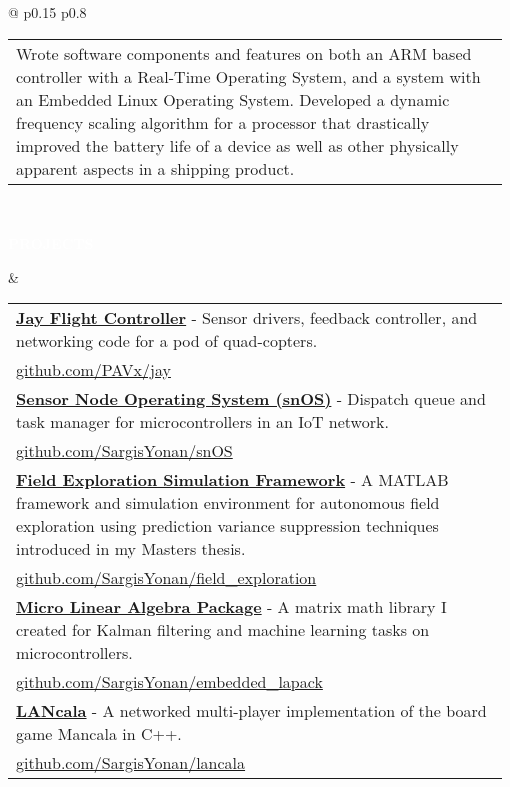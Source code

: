 \documentclass[letterpaper,11pt,oneside,a4paper]{article}
\makeatletter
\newlength{\@mcb@width}
\newcommand{\sectioninverttitle}[2][]{{%
    \setkeys{mcb}{width=0.5\linewidth,bg=blackbg,#1}%
    \colorbox{\@mcb@bg}{\begin{minipage}{\@mcb@width}
    \strut#2\strut
  \end{minipage}}
}}
\newcommand{\sectiontitle}[1]{\sectioninverttitle[width=0.135\textwidth]{\textcolor{white}{\textbf{\normalsize{#1}}}}}
\def \tablefillwidth {0.98\linewidth}
\makeatother
\begin{document}
\begin{longtable}{@{\extracolsep{\fill}} p{0.15\textwidth} p{0.8\textwidth}}
\begin{tabular}[t]{@{\extracolsep{\fill}} p{\tablefillwidth}}
Wrote software components and features on both an ARM based controller with a Real-Time Operating System, and a system with an Embedded Linux Operating System.
Developed a dynamic frequency scaling algorithm for a processor that drastically improved the battery life of a device as well as other physically apparent aspects in a shipping product.
\end{tabular}

\vspace{1em}
\\

\sectiontitle{PROJECTS}
&
\begin{tabular}[t]{@{\extracolsep{\fill}} p{\tablefillwidth}}

\href{https://www.github.com/PAVx/jay}{\textbf{Jay Flight Controller}} - Sensor drivers, feedback controller, and networking code for a pod of quad-copters.\\
\href{https://www.github.com/PAVx/jay}{\scriptsize github.com/PAVx/jay}\\

\href{https://www.github.com/SargisYonan/snOS}{\textbf{Sensor Node Operating System (snOS)}} - Dispatch queue and task manager for microcontrollers in an IoT network.\\
\href{https://github.com/SargisYonan/snOS}{\scriptsize github.com/SargisYonan/snOS}\\

\href{https://github.com/SargisYonan/field_exploration}{\textbf{Field Exploration Simulation Framework}} - A MATLAB framework and simulation environment for autonomous field exploration using prediction variance suppression techniques introduced in my Masters thesis.\\
\href{https://github.com/SargisYonan/field_exploration}{\scriptsize github.com/SargisYonan/field\_exploration}\\

\href{https://github.com/SargisYonan/embedded_lapack}{\textbf{Micro Linear Algebra Package}} - A matrix math library I created for Kalman filtering and machine learning tasks on microcontrollers.\\
\href{https://github.com/SargisYonan/embedded_lapack}{\scriptsize github.com/SargisYonan/embedded\_lapack}\\

\href{https://github.com/SargisYonan/lancala}{\textbf{LANcala}} - A networked multi-player implementation of the board game Mancala in C++.\\
\href{https://github.com/SargisYonan/lancala}{\scriptsize github.com/SargisYonan/lancala}


\end{tabular}
\end{longtable}
\end{document}
